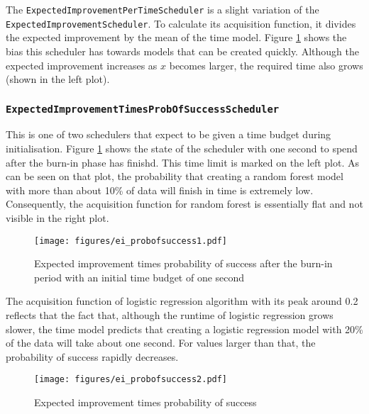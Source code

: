 \documentclass[a4paper,12pt,twoside,openright]{report}
\begin{document}
The \texttt{ExpectedImprovementPerTimeScheduler} is a slight variation of the \texttt{ExpectedImprovementScheduler}. To calculate its acquisition function, it divides the expected improvement by the mean of the time model. Figure \ref{sched:expimprpertime01} shows the bias this scheduler has towards models that can be created quickly. Although the expected improvement increases as $x$ becomes larger, the required time also grows (shown in the left plot).

\subsubsection{\texttt{ExpectedImprovementTimesProbOfSuccessScheduler}}

This is one of two schedulers that expect to be given a time budget during initialisation. Figure \ref{sched:expimprpertime01} shows the state of the scheduler with one second to spend after the burn-in phase has finishd. This time limit is marked on the left plot. As can be seen on that plot, the probability that creating a random forest model with more than about 10\% of data will finish in time is extremely low. Consequently, the acquisition function for random forest is essentially flat and not visible in the right plot.

\begin{figure}
\centering
  \texttt{[image: figures/ei\_probofsuccess1.pdf]}
  \caption{Expected improvement times probability of success after the burn-in period with an initial time budget of one second}
  \label{sched:expimprpertime01}
\end{figure}

The acquisition function of logistic regression algorithm with its peak around 0.2 reflects that the fact that, although the runtime of logistic regression grows slower, the time model predicts that creating a logistic regression model with 20\% of the data will take about one second. For values larger than that, the probability of success rapidly decreases.

\begin{figure}
\centering
  \texttt{[image: figures/ei\_probofsuccess2.pdf]}
  \caption{Expected improvement times probability of success}
  \label{sched:expimprpertime02}
\end{figure}
\end{document}
